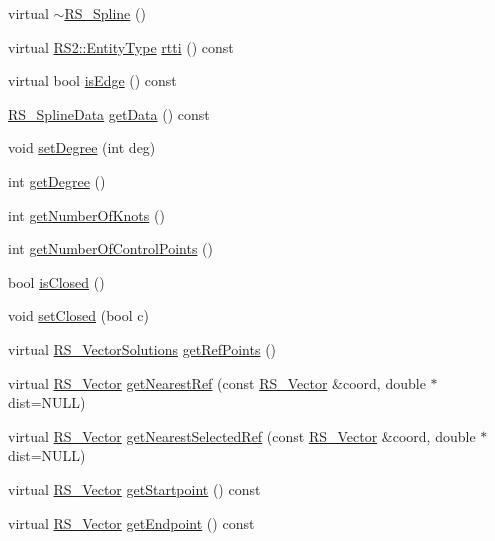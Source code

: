 \begin{DoxyCompactItemize}
\item 
virtual \hyperlink{classRS__Spline_a6d30da2e2a1878dbb39b6f5998bf2c37}{$\sim$\-R\-S\-\_\-\-Spline} ()
\item 
virtual \hyperlink{classRS2_a8f26d1b981e1e85cff16738b43337e6a}{R\-S2\-::\-Entity\-Type} \hyperlink{classRS__Spline_a2209ff22720f8431c524cff82d43999b}{rtti} () const 
\item 
virtual bool \hyperlink{classRS__Spline_a63841fa451c155052683af686986e4b4}{is\-Edge} () const 
\item 
\hyperlink{classRS__SplineData}{R\-S\-\_\-\-Spline\-Data} \hyperlink{classRS__Spline_aac1a47d960968611aa585a1900665586}{get\-Data} () const 
\item 
void \hyperlink{classRS__Spline_a8ea2beab3c0668c4fe98473a7a263166}{set\-Degree} (int deg)
\item 
int \hyperlink{classRS__Spline_a285a63ac0b6be6387100ed2545498067}{get\-Degree} ()
\item 
int \hyperlink{classRS__Spline_acf4f4032007b72e86a24a162ba4ae682}{get\-Number\-Of\-Knots} ()
\item 
int \hyperlink{classRS__Spline_ae93600828361d4e1d30a2d8630f88e47}{get\-Number\-Of\-Control\-Points} ()
\item 
bool \hyperlink{classRS__Spline_a7e252d42870c970938961564efebbb7a}{is\-Closed} ()
\item 
void \hyperlink{classRS__Spline_a93139ef7957405e9148d14cad3e059cd}{set\-Closed} (bool c)
\item 
virtual \hyperlink{classRS__VectorSolutions}{R\-S\-\_\-\-Vector\-Solutions} \hyperlink{classRS__Spline_ab4f80d174f9282526645bd8613c3fea2}{get\-Ref\-Points} ()
\item 
virtual \hyperlink{classRS__Vector}{R\-S\-\_\-\-Vector} \hyperlink{classRS__Spline_aac7c380a3722178c13cedfa31d982479}{get\-Nearest\-Ref} (const \hyperlink{classRS__Vector}{R\-S\-\_\-\-Vector} \&coord, double $\ast$dist=N\-U\-L\-L)
\item 
virtual \hyperlink{classRS__Vector}{R\-S\-\_\-\-Vector} \hyperlink{classRS__Spline_a04c269d07eb72075f9c2f021255b0816}{get\-Nearest\-Selected\-Ref} (const \hyperlink{classRS__Vector}{R\-S\-\_\-\-Vector} \&coord, double $\ast$dist=N\-U\-L\-L)
\item 
virtual \hyperlink{classRS__Vector}{R\-S\-\_\-\-Vector} \hyperlink{classRS__Spline_af9cc8ca95415b7cb4f6cfa1ed94a8300}{get\-Startpoint} () const 
\item 
virtual \hyperlink{classRS__Vector}{R\-S\-\_\-\-Vector} \hyperlink{classRS__Spline_a1271d3558d26764ec3c8d9d96feb3538}{get\-Endpoint} () const 

\end{DoxyCompactItemize}

